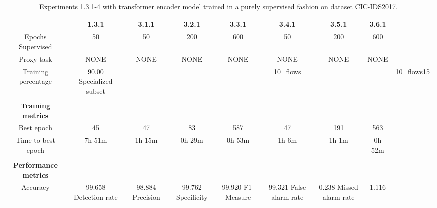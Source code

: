 \begin{table}[htb]
    \centering
    \begin{tabular}{@{}cccccccc@{}}
        \toprule
         & 1.3.1 & 3.1.1 & 3.2.1 & 3.3.1 & 3.4.1 & 3.5.1 & 3.6.1 \\
        \midrule
        Epochs Supervised &  50 &  50 &  200 &  600 &  50 &  200 &  600 \\
        Proxy task &  NONE &  NONE &  NONE &  NONE &  NONE &  NONE &  NONE \\
        Training percentage &  90.00 %
        Specialized subset &   &   &   &  10_flows &   &   &  10_flows15 \\
         \\
        \textbf{Training metrics} &  &  &  &  &  &  &  \\
        Best epoch &  45 &  47 &  83 &  587 &  47 &  191 &  563 \\
        Time to best epoch &  7h 51m &  1h 15m &  0h 29m &  0h 53m &  1h 6m &  1h 1m &  0h 52m \\
         \\
        \textbf{Performance metrics} &  &  &  &  &  &  &  \\
        Accuracy &  99.658 %
        Detection rate &  98.884 %
        Precision &  99.762 %
        Specificity &  99.920 %
        F1-Measure &  99.321 %
        False alarm rate &  0.238 %
        Missed alarm rate &  1.116 %
        \bottomrule
    \end{tabular}
    \caption{Experiments 1.3.1-4 with transformer encoder model trained in a purely supervised fashion on dataset CIC-IDS2017.}
    \label{table:results:lstm:stats_flows_supervised}
\end{table}
